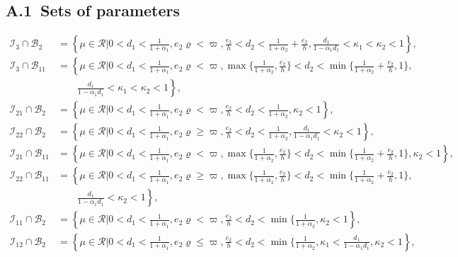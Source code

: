 \documentclass{ws-ijbc}
\begin{document}
\subsection*{A.1~Sets of parameters}
\begin{equation*}
  \begin{aligned}
  \mathcal{I}_{3}\cap\mathcal{B}_{2}&=\left\{\mu\in\mathcal{R}
  \big| 0<d_{1}<\frac{1}{1+\alpha_{1}}, e_{2}\varrho<\varpi, \frac{e_{2}}{h}<d_{2}<\frac{1}{1+\alpha_{2}}+\frac{e_{2}}{h}, \frac{d_{1}}{1-\alpha_{1}d_{1}}<\kappa_{1}<\kappa_{2}<1 \right\},\\
  \mathcal{I}_{3}\cap\mathcal{B}_{11} &= \left\{\mu\in\mathcal{R} \big|
  0<d_{1}<\frac{1}{1+\alpha_{1}}, e_{2}\varrho<\varpi, \max\{\frac{1}{1+\alpha_{2}},\frac{e_{2}}{h}\}<d_{2}<\min\{\frac{1}{1+\alpha_{2}}+\frac{e_{2}}{h},1\}, \right.\\
  &\qquad\left.\frac{d_{1}}{1-\alpha_{1}d_{1}}<\kappa_{1}<\kappa_{2}<1 \right\},\\
    \mathcal{I}_{21}\cap\mathcal{B}_{2}&=\left\{\mu\in\mathcal{R}
  \big| 0<d_{1}<\frac{1}{1+\alpha_{1}}, e_{2}\varrho<\varpi, \frac{e_{2}}{h}<d_{2}<\frac{1}{1+\alpha_{2}},\kappa_{2}<1 \right\},\\
  \mathcal{I}_{22}\cap\mathcal{B}_{2}&=\left\{\mu\in \mathcal{R}
\big|0<d_{1}<\frac{1}{1+\alpha_{1}},e_{2}\varrho\geq\varpi, \frac{e_{2}}{h}<d_{2}<\frac{1}{1+\alpha_{2}},\frac{d_{1}}{1-\alpha_{1}d_{1}}<\kappa_{2}<1 \right\},\\
\mathcal{I}_{21}\cap\mathcal{B}_{11}&=\left\{\mu\in \mathcal{R}
\big|0<d_{1}<\frac{1}{1+\alpha_{1}},e_{2}\varrho<\varpi, \max\{\frac{1}{1+\alpha_{2}},\frac{e_{2}}{h}\}<d_{2}<\min\{\frac{1}{1+\alpha_{2}}+\frac{e_{2}}{h},1\}, \kappa_{2}<1 \right\},\\
\mathcal{I}_{22}\cap\mathcal{B}_{11}&=\left\{\mu\in \mathcal{R}
\big|0<d_{1}<\frac{1}{1+\alpha_{1}},e_{2}\varrho\geq\varpi, \max\{\frac{1}{1+\alpha_{2}},\frac{e_{2}}{h}\}<d_{2}<\min\{\frac{1}{1+\alpha_{2}}+\frac{e_{2}}{h},1\},\right.\\
&\qquad\left.\frac{d_{1}}{1-\alpha_{1}d_{1}}<\kappa_{2}<1 \right\},\\
\mathcal{I}_{11}\cap\mathcal{B}_{2}&=\left\{\mu\in \mathcal{R}
\big|0<d_{1}<\frac{1}{1+\alpha_{1}},e_{2}\varrho<\varpi,\frac{e_{2}}{h}<d_{2}<\min\{\frac{1}{1+\alpha_{2}},\kappa_{2}<1 \right\},\\
\mathcal{I}_{12}\cap\mathcal{B}_{2}&=\left\{\mu\in \mathcal{R}
\big|0<d_{1}<\frac{1}{1+\alpha_{1}},e_{2}\varrho\leq\varpi,\frac{e_{2}}{h}<d_{2}<\min\{\frac{1}{1+\alpha_{2}},\kappa_{1}<\frac{d_{1}}{1-\alpha_{1}d_{1}}, \kappa_{2}<1 \right\},\\

\end{aligned}
\end{equation*}
\end{document}

